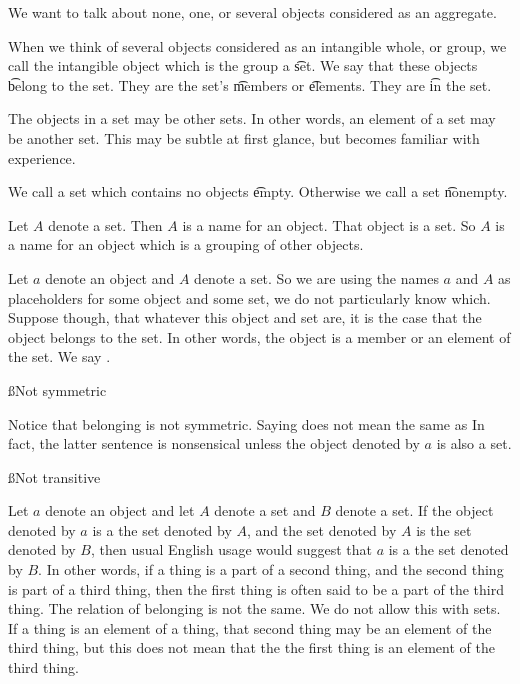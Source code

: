 

We want to talk about none, one, or several objects considered as an aggregate.


When we think of several objects considered as an intangible whole, or group, we call the intangible object which is the group a \t{set}.
We say that these objects \t{belong} to the set.
They are the set's \t{members} or \t{elements}.
They are \t{in} the set.

The objects in a set may be other sets.
In other words, an element of a set may be another set.
This may be subtle at first glance, but becomes familiar with experience.

We call a set which contains no objects \t{empty}.
Otherwise we call a set \t{nonempty}.


Let $A$ denote a set.
Then $A$ is a name for an object.
That object is a set.
So $A$ is a name for an object which is a grouping of other objects.


Let $a$ denote an object and $A$ denote a set.
So we are using the names $a$ and $A$ as placeholders for some object and some set, we do not particularly know which.
Suppose though, that whatever this object and set are, it is the case that the object belongs to the set.
In other words, the object is a member or an element of the set.
We say .

\ss{Not symmetric}

Notice that belonging is not symmetric.
Saying  does not mean the same as 
In fact, the latter sentence is nonsensical unless the object denoted by $a$ is also a set.

\ss{Not transitive}

Let $a$ denote an object and let $A$ denote a set and $B$ denote a set.
If the object denoted by $a$ is  a the set denoted by $A$, and the set denoted by $A$ is  the set denoted by $B$, then usual English usage would suggest that $a$ is a  the set denoted by $B$.
In other words, if a thing is a part of a second thing, and the second thing is part of a third thing, then the first thing is often said to be a part of the third thing.
The relation of belonging is not the same.
We do not allow this with sets.
If a thing is an element of a thing, that second thing may be an element of the third thing, but this does not mean that the the first thing is an element of the third thing.

